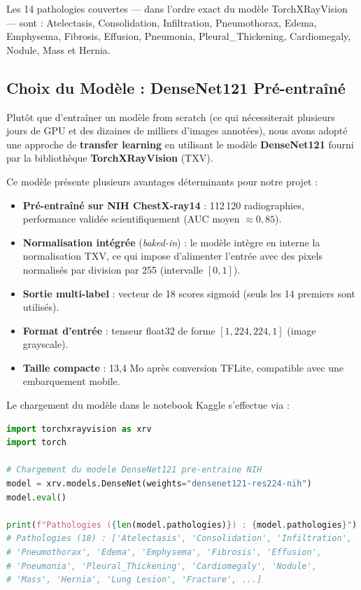 \documentclass[12pt,a4paper]{report}
\begin{document}
Les 14 pathologies couvertes — dans l'ordre exact du modèle TorchXRayVision —
sont : Atelectasis, Consolidation, Infiltration, Pneumothorax, Edema,
Emphysema, Fibrosis, Effusion, Pneumonia, Pleural\_Thickening, Cardiomegaly,
Nodule, Mass et Hernia.

\subsection{Choix du Modèle : DenseNet121 Pré-entraîné}

Plutôt que d'entraîner un modèle from scratch (ce qui nécessiterait plusieurs
jours de GPU et des dizaines de milliers d'images annotées), nous avons adopté
une approche de \textbf{transfer learning} en utilisant le modèle
\textbf{DenseNet121} fourni par la bibliothèque \textbf{TorchXRayVision} (TXV).

Ce modèle présente plusieurs avantages déterminants pour notre projet :

\begin{itemize}
  \item \textbf{Pré-entraîné sur NIH ChestX-ray14} : 112\,120 radiographies,
    performance validée scientifiquement (AUC moyen $\approx 0{,}85$).
  \item \textbf{Normalisation intégrée} (\textit{baked-in}) : le modèle intègre
    en interne la normalisation TXV, ce qui impose d'alimenter l'entrée avec
    des pixels normalisés par division par 255 (intervalle $[0,1]$).
  \item \textbf{Sortie multi-label} : vecteur de 18 scores sigmoid (seuls les
    14 premiers sont utilisés).
  \item \textbf{Format d'entrée} : tenseur float32 de forme $[1, 224, 224, 1]$
    (image grayscale).
  \item \textbf{Taille compacte} : 13,4 Mo après conversion TFLite, compatible
    avec une embarquement mobile.
\end{itemize}

Le chargement du modèle dans le notebook Kaggle s'effectue via :

\begin{lstlisting}[language=Python, caption={Chargement du modèle TorchXRayVision sur Kaggle}, label={lst:txv_load}]
import torchxrayvision as xrv
import torch

# Chargement du modele DenseNet121 pre-entraine NIH
model = xrv.models.DenseNet(weights="densenet121-res224-nih")
model.eval()

print(f"Pathologies ({len(model.pathologies)}) : {model.pathologies}")
# Pathologies (18) : ['Atelectasis', 'Consolidation', 'Infiltration',
# 'Pneumothorax', 'Edema', 'Emphysema', 'Fibrosis', 'Effusion',
# 'Pneumonia', 'Pleural_Thickening', 'Cardiomegaly', 'Nodule',
# 'Mass', 'Hernia', 'Lung Lesion', 'Fracture', ...]
\end{lstlisting}
\end{document}
